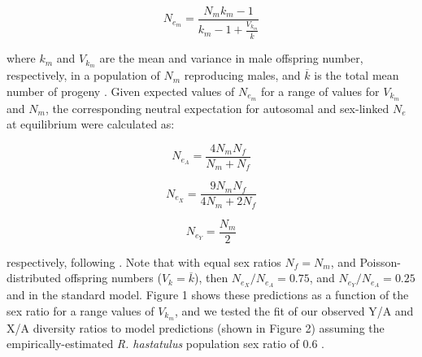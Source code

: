 \documentclass[9pt,twocolumn,twoside]{gsajnl}
\begin{document}
\begin{equation}
N_{e_{m}}=\frac{N_{m}k_{m}-1}{k_{m}-1+\frac{V_{k_{m}}}{\overline{k}}} \label{eq:Vk}
\end{equation}

where $k_{m}$ and $V_{k_{m}}$ are the mean and variance in male offspring number, respectively, in a population of $N_{m}$ reproducing males, and $\overline{k}$ is the total mean number of progeny \citep{kimura1964number}. Given expected values of $N_e_{m}$ for a range of values for $V_{k_{m}}$ and $N_{m}$, the corresponding neutral expectation for autosomal and sex-linked $N_{e}$ at equilibrium were calculated as:

\begin{equation}
N_{e_{A}} = \frac{4N_{m}N_{f}}{N_{m}+N_{f}} \label{eq:Ne}
\end{equation}

\begin{equation}
N_{e_{X}} = \frac{9N_{m}N_{f}}{4N_{m}+2N_{f}} \label{eq:NeX}
\end{equation}

\begin{equation}
N_{e_{Y}} = \frac{N_{m}}{2} \label{eq:NeY}
\end{equation}

respectively, following \citep{wright1931evolution}. Note that with equal sex ratios $N_{f} = N_{m}$, and Poisson-distributed offspring numbers ($V_{k} = \overline{k}$), then $N_{e_{X}}/N_{e_{A}} = 0.75$, and $N_{e_{Y}}/N_{e_{A}} = 0.25$ and in the standard model. Figure 1 shows these predictions as a function of the sex ratio for a range values of $V_{k_{m}}$, and we tested the fit of our observed Y/A and X/A diversity ratios to model predictions (shown in Figure 2) assuming the empirically-estimated \textit{R. hastatulus} population sex ratio of 0.6 \citep{pickup2013influence}.
\end{document}
